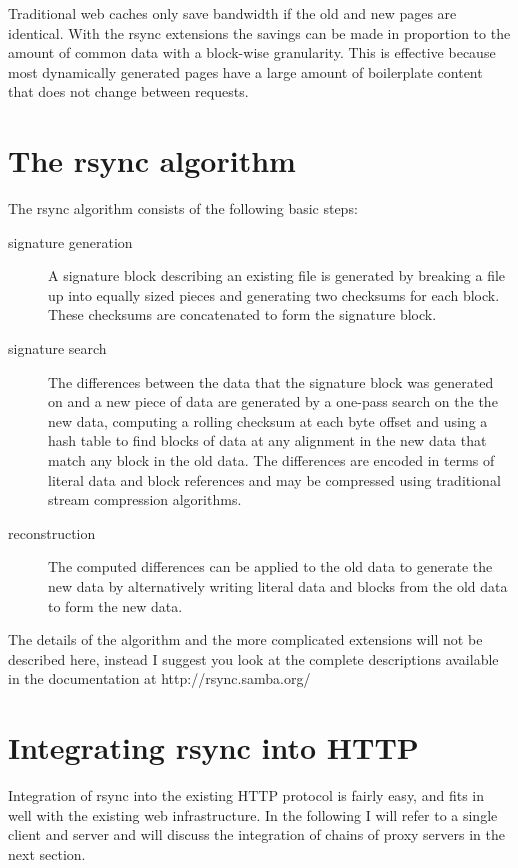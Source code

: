\documentclass[a4paper]{article}
\begin{document}
Traditional web caches only save bandwidth if the old and new pages
are identical. With the rsync extensions the savings can be made in
proportion to the amount of common data with a block-wise granularity.
This is effective because most dynamically generated pages have a
large amount of boilerplate content that does not change between
requests.

\section*{The rsync algorithm}

The rsync algorithm consists of the following basic steps:

\begin{description}
\item [signature generation] A signature block describing an existing
  file is generated by breaking a file up into equally sized pieces
  and generating two checksums for each block. These checksums are
  concatenated to form the signature block.
\item [signature search] The differences between the data that the
  signature block was generated on and a new piece of data are
  generated by a one-pass search on the the new data, computing a
  rolling checksum at each byte offset and using a hash table to find
  blocks of data at any alignment in the new data that match any block
  in the old data. The differences are encoded in terms of literal
  data and block references and may be compressed using traditional
  stream compression algorithms.
\item [reconstruction] The computed differences can be applied to the
  old data to generate the new data by alternatively writing literal
  data and blocks from the old data to form the new data.
\end{description}

The details of the algorithm and the more complicated extensions will
not be described here, instead I suggest you look at
the complete descriptions available in the documentation at
http://rsync.samba.org/ 

\section*{Integrating rsync into HTTP}

Integration of rsync into the existing HTTP protocol is fairly
easy, and fits in well with the existing web infrastructure. In the
following I will refer to a single client and server and will discuss
the integration of chains of proxy servers in the next section.
\end{document}
